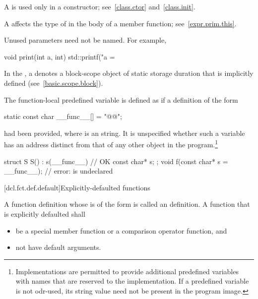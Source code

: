 \pnum
{}%
%
%
A
is used only in a constructor; see~\ref{class.ctor} and~\ref{class.init}.

\pnum
\begin{note}
A  affects the type of 
in the body of a member function; see~\ref{expr.prim.this}.
\end{note}

\pnum
\begin{note}
Unused parameters need not be named.
For example,

\begin{codeblock}
void print(int a, int) {
  std::printf("a = %
}
\end{codeblock}
\end{note}

\pnum
In the , a
 denotes a block-scope object of static
storage duration that is implicitly defined (see~\ref{basic.scope.block}).

\pnum
{}%
The function-local predefined variable  is
defined as if a definition of the form
\begin{codeblock}
static const char __func__[] = "@@";
\end{codeblock}
had been provided, where  is an  string.
It is unspecified whether such a variable has an address
distinct from that of any other object in the program.\footnote{Implementations are
permitted to provide additional predefined variables with names that are reserved to the
implementation. If a predefined variable is not
odr-used, its string value need not be present in the program image.}
\begin{example}
\begin{codeblock}
struct S {
  S() : s(__func__) { }             // OK
  const char* s;
};
void f(const char* s = __func__);   // error:  is undeclared
\end{codeblock}
\end{example}

[dcl.fct.def.default]{Explicitly-defaulted functions}%

\pnum
A function definition whose
is of the form
is called an  definition.
A function that is explicitly defaulted shall
\begin{itemize}
\item be a special member function or
a comparison operator function, and
\item not have default arguments.
\end{itemize}

